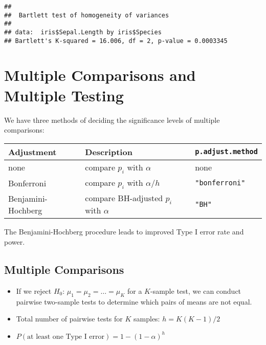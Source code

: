 \documentclass[
]{book}
\newenvironment{Shaded}{\begin{snugshade}}{\end{snugshade}}
\newcommand{\KeywordTok}[1]{\textcolor[rgb]{0.13,0.29,0.53}{\textbf{#1}}}
\newcommand{\NormalTok}[1]{#1}
\newcommand{\OperatorTok}[1]{\textcolor[rgb]{0.81,0.36,0.00}{\textbf{#1}}}
\newcommand{\StringTok}[1]{\textcolor[rgb]{0.31,0.60,0.02}{#1}}
\providecommand{\tightlist}{%
  \setlength{\itemsep}{0pt}\setlength{\parskip}{0pt}}
\begin{document}
\begin{Shaded}
\end{Shaded}

\begin{verbatim}
## 
##  Bartlett test of homogeneity of variances
## 
## data:  iris$Sepal.Length by iris$Species
## Bartlett's K-squared = 16.006, df = 2, p-value = 0.0003345
\end{verbatim}

\hypertarget{multiple-comparisons-and-multiple-testing}{%
\section{Multiple Comparisons and Multiple Testing}\label{multiple-comparisons-and-multiple-testing}}

We have three methods of deciding the significance levels of multiple comparisons:

\begin{longtable}[]{@{}lll@{}}
\toprule
Adjustment & Description & \texttt{p.adjust.method}\tabularnewline
\midrule
\endhead
none & compare \(p_i\) with \(\alpha\) & none\tabularnewline
Bonferroni & compare \(p_i\) with \(\alpha / h\) & \texttt{"bonferroni"}\tabularnewline
Benjamini-Hochberg & compare BH-adjusted \(p_i\) with \(\alpha\) & \texttt{"BH"}\tabularnewline
\bottomrule
\end{longtable}

The Benjamini-Hochberg procedure leads to improved Type I error rate and power.

\hypertarget{multiple-comparisons}{%
\subsection{Multiple Comparisons}\label{multiple-comparisons}}

\begin{itemize}
\tightlist
\item
  If we reject \(H_0\): \(\mu_1 = \mu_2 = \dots = \mu_K\) for a \(K\)-sample test,
  we can conduct pairwise two-sample tests to determine which pairs of means
  are not equal.
\item
  Total number of pairwise tests for \(K\) samples: \(h = K(K-1)/2\)
\item
  \(P(\text{at least one Type I error}) = 1 - (1 - \alpha)^h\)
\end{itemize}
\end{document}
